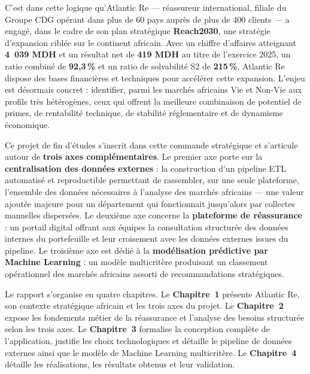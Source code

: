 \documentclass[12pt,a4paper]{report}
\begin{document}
C'est dans cette logique qu'Atlantic Re --- réassureur international, filiale du
Groupe CDG opérant dans plus de 60 pays auprès de plus de 400 clients --- a engagé,
dans le cadre de son plan stratégique \textbf{Reach2030}, une stratégie d'expansion
ciblée sur le continent africain. Avec un chiffre d'affaires atteignant
\textbf{4~039 MDH} et un résultat net de \textbf{419 MDH} au titre de l'exercice
2025, un ratio combiné de \textbf{92,3\,\%} et un ratio de solvabilité S2 de
\textbf{215\,\%}, Atlantic Re dispose des bases financières et techniques pour
accélérer cette expansion. L'enjeu est désormais concret : identifier, parmi les
marchés africains Vie et Non-Vie aux profils très hétérogènes, ceux qui offrent la
meilleure combinaison de potentiel de primes, de rentabilité technique, de stabilité
réglementaire et de dynamisme économique.

Ce projet de fin d'études s'inscrit dans cette commande stratégique et s'articule
autour de \textbf{trois axes complémentaires}. Le premier axe porte sur la
\textbf{centralisation des données externes} : la construction d'un pipeline ETL
automatisé et reproductible permettant de rassembler, sur une seule plateforme,
l'ensemble des données nécessaires à l'analyse des marchés africains --- une valeur
ajoutée majeure pour un département qui fonctionnait jusqu'alors par collectes
manuelles dispersées. Le deuxième axe concerne la \textbf{plateforme de réassurance} :
un portail digital offrant aux équipes la consultation structurée des données internes
du portefeuille et leur croisement avec les données externes issues du pipeline. Le
troisième axe est dédié à la \textbf{modélisation prédictive par Machine Learning} :
un modèle multicritère produisant un classement opérationnel des marchés africains
assorti de recommandations stratégiques.

Le rapport s'organise en quatre chapitres. Le \textbf{Chapitre~1} présente Atlantic
Re, son contexte stratégique africain et les trois axes du projet. Le
\textbf{Chapitre~2} expose les fondements métier de la réassurance et l'analyse des
besoins structurée selon les trois axes. Le \textbf{Chapitre~3} formalise la
conception complète de l'application, justifie les choix technologiques et détaille
le pipeline de données externes ainsi que le modèle de Machine Learning multicritère.
Le \textbf{Chapitre~4} détaille les réalisations, les résultats obtenus et leur
validation.

\clearpage

\end{document}
